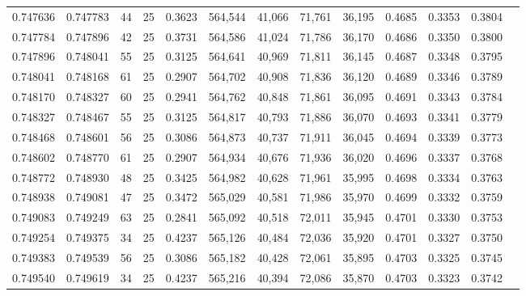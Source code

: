 \begin{tabular}{rrrrrrrrrrrrr}
0.747636 & 0.747783 &    44 &  25 &                                     0.3623 & 564,544 &  41,066 &  71,761 &  36,195 & 0.4685 & 0.3353 & 0.3804 \\
0.747784 & 0.747896 &    42 &  25 &                                     0.3731 & 564,586 &  41,024 &  71,786 &  36,170 & 0.4686 & 0.3350 & 0.3800 \\
0.747896 & 0.748041 &    55 &  25 &                                     0.3125 & 564,641 &  40,969 &  71,811 &  36,145 & 0.4687 & 0.3348 & 0.3795 \\
0.748041 & 0.748168 &    61 &  25 &                                     0.2907 & 564,702 &  40,908 &  71,836 &  36,120 & 0.4689 & 0.3346 & 0.3789 \\
0.748170 & 0.748327 &    60 &  25 &                                     0.2941 & 564,762 &  40,848 &  71,861 &  36,095 & 0.4691 & 0.3343 & 0.3784 \\
0.748327 & 0.748467 &    55 &  25 &                                     0.3125 & 564,817 &  40,793 &  71,886 &  36,070 & 0.4693 & 0.3341 & 0.3779 \\
0.748468 & 0.748601 &    56 &  25 &                                     0.3086 & 564,873 &  40,737 &  71,911 &  36,045 & 0.4694 & 0.3339 & 0.3773 \\
0.748602 & 0.748770 &    61 &  25 &                                     0.2907 & 564,934 &  40,676 &  71,936 &  36,020 & 0.4696 & 0.3337 & 0.3768 \\
0.748772 & 0.748930 &    48 &  25 &                                     0.3425 & 564,982 &  40,628 &  71,961 &  35,995 & 0.4698 & 0.3334 & 0.3763 \\
0.748938 & 0.749081 &    47 &  25 &                                     0.3472 & 565,029 &  40,581 &  71,986 &  35,970 & 0.4699 & 0.3332 & 0.3759 \\
0.749083 & 0.749249 &    63 &  25 &                                     0.2841 & 565,092 &  40,518 &  72,011 &  35,945 & 0.4701 & 0.3330 & 0.3753 \\
0.749254 & 0.749375 &    34 &  25 &                                     0.4237 & 565,126 &  40,484 &  72,036 &  35,920 & 0.4701 & 0.3327 & 0.3750 \\
0.749383 & 0.749539 &    56 &  25 &                                     0.3086 & 565,182 &  40,428 &  72,061 &  35,895 & 0.4703 & 0.3325 & 0.3745 \\
0.749540 & 0.749619 &    34 &  25 &                                     0.4237 & 565,216 &  40,394 &  72,086 &  35,870 & 0.4703 & 0.3323 & 0.3742 \\

\end{tabular}
